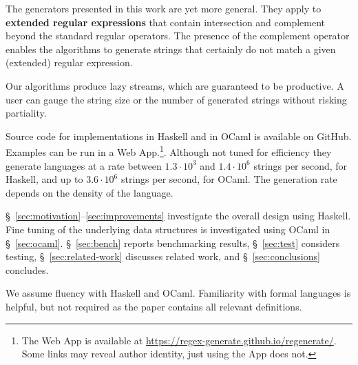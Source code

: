 The generators presented in this work are yet more general. They
apply to \textbf{extended regular expressions} that contain
intersection and complement beyond the standard regular operators. The presence
of the complement operator enables the algorithms to generate strings
that certainly do not match a given (extended) regular expression.

Our algorithms produce lazy streams, which are guaranteed to be
productive. A user can gauge the string size or the
number of generated strings without risking partiality.

Source code for implementations in Haskell and in OCaml is available
on GitHub. Examples can be run in a Web App.\footnote{%
  The Web App is available at
  \url{https://regex-generate.github.io/regenerate/}.  Some links may
  reveal author identity, just using the App does not.  }.  Although
not tuned for efficiency they generate languages at a rate
between $1.3\cdot10^3$ and $1.4\cdot10^6$ strings per second, for
Haskell, and up to $3.6\cdot10^6$ strings per second, for OCaml. The
generation rate depends on the density of the language.

\S~\ref{sec:motivation}--\ref{sec:improvements} investigate the
overall design using Haskell. Fine tuning of the underlying data
structures is investigated using OCaml in \S~\ref{sec:ocaml}.
\S~\ref{sec:bench} reports benchmarking results, \S~\ref{sec:test}
considers testing, \S~\ref{sec:related-work} discusses related work,
and \S~\ref{sec:conclusions} concludes.

We assume fluency with Haskell and OCaml. 
Familiarity with formal languages is helpful, but not required as the
paper contains all relevant definitions. 


